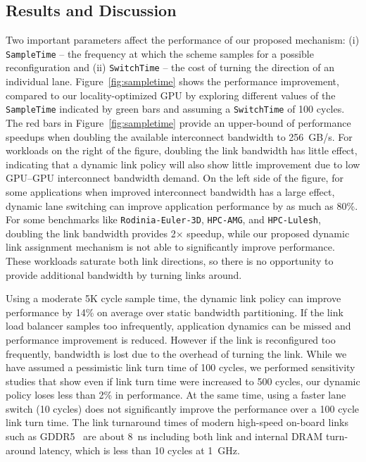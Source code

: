 \subsection{Results and Discussion} 

Two important parameters affect the performance of
our proposed mechanism: (i)
\texttt{SampleTime} -- the frequency at which the scheme samples for a possible
reconfiguration and (ii) \texttt{SwitchTime} -- the cost of turning the
direction of an individual lane. Figure~\ref{fig:sampletime} shows the 
performance improvement, compared to our locality-optimized GPU by exploring different values of the
\texttt{SampleTime} indicated by green bars and assuming a \texttt{SwitchTime}
of 100 cycles. The red bars in Figure~\ref{fig:sampletime} provide an
upper-bound of performance speedups when doubling the available interconnect
bandwidth to \SI{256}{GB/s}. For workloads on the right of the figure, doubling the link
bandwidth has little effect, indicating that a dynamic link policy will also show little
improvement due to low GPU--GPU interconnect bandwidth demand.
On the left side of the figure, for some
applications when improved interconnect bandwidth has a large effect,
dynamic lane switching can improve application performance by as much as 80\%.
For some benchmarks like \texttt{Rodinia-Euler-3D}, \texttt{HPC-AMG}, and 
\texttt{HPC-Lulesh}, doubling the link bandwidth provides 2$\times$ 
speedup, while our proposed dynamic link assignment mechanism is not 
able to significantly improve performance. These workloads 
saturate both link directions, so there is no opportunity to 
provide additional bandwidth by turning links around.

Using a moderate 5K cycle sample time, the dynamic link policy can improve performance
by 14\% on average over static bandwidth partitioning. If the link load
balancer samples too infrequently, application dynamics can be missed
and performance improvement is reduced. However if the link is reconfigured
too frequently, bandwidth is lost due to the overhead of turning the link.
While we have assumed a pessimistic link turn time of 100 cycles, we performed
sensitivity studies that show even if link turn time were increased to 500
cycles, our dynamic policy loses less than 2\% in performance. 
At the same time, using a faster lane switch (10 cycles) does not
significantly improve the performance over a 100 cycle link turn time.
The link
turnaround times of modern high-speed on-board links such as
GDDR5~\cite{hynixgddr51Gb} are about \SI{8}{ns} including both link and internal 
DRAM turn-around latency, which is less than 10 cycles at \SI{1}{GHz}.

